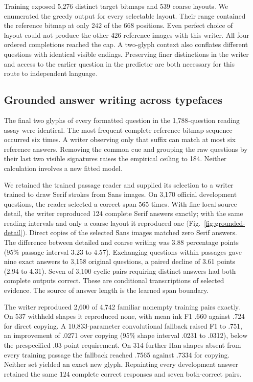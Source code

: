 \documentclass[12pt,a4paper]{article}
\providecommand{\DIFadd}[1]{{\protect\color{blue} \sf #1}} %
\begin{document}
\DIFadd{Training exposed 5,276 distinct target bitmaps and 539 coarse layouts.
We enumerated the greedy output for every selectable layout. Their range
contained the reference bitmap at only 242 of the 668 positions. Even perfect
choice of layout could not produce the other 426 reference images with this
writer. All four ordered completions reached the cap. A two-glyph context
also conflates different questions with identical visible endings. Preserving
finer distinctions in the writer and access to the earlier question in the
predictor are both necessary for this route to independent language.
}

\subsection*{\DIFadd{Grounded answer writing across typefaces}}
\DIFadd{The final two glyphs of every formatted question in the 1,788-question
reading assay were identical. The most frequent complete reference bitmap
sequence occurred six times. A writer observing only that suffix can match
at most six reference answers. Removing the common cue and grouping the
raw questions by their last two visible signatures raises the empirical
ceiling to 184. Neither calculation involves a new fitted model.
}

\DIFadd{We retained the trained passage reader and supplied its selection to a writer
trained to draw Serif strokes from Sans images. On 3,170 official development
questions, the reader selected a correct span 565 times. With fine local
source detail, the writer reproduced 124 complete Serif answers exactly;
with the same reading intervals and only a coarse layout it reproduced one
(Fig.~\ref{fig:grounded-detail}). Direct copies of the selected Sans images
matched zero Serif answers. The difference between detailed and coarse writing
was 3.88 percentage points (95\% passage interval 3.23 to 4.57).
Exchanging questions within passages gave nine exact answers to 3,158
original questions, a paired decline of 3.61 points (2.94 to 4.31).
Seven of 3,100 cyclic pairs requiring distinct answers had both complete
outputs correct. These are conditional transcriptions of selected evidence.
The source of answer length is the learned span boundary.
}

\DIFadd{The writer reproduced 2,600 of 4,742 familiar nonempty training pairs exactly.
On 537 withheld shapes it reproduced none, with mean ink F1 .660 against .724
for direct copying. A 10,833-parameter convolutional fallback raised F1 to
.751, an improvement of .0271 over copying (95\% shape interval .0231 to
.0312), below the prespecified .03 point requirement. On 314 further Han
shapes absent from every training passage the fallback reached .7565 against
.7334 for copying. Neither set yielded an exact new glyph. Repainting every
development answer retained the same 124 complete correct responses and
seven both-correct pairs.
}
\end{document}

